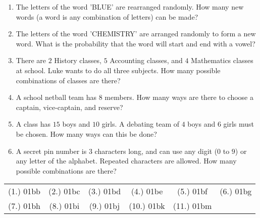 \begin{eocexercises}{}
\begin{enumerate}
\item The letters of the word 'BLUE' are rearranged randomly. How many new words (a word is any combination of letters) can be made?

\item The letters of the word 'CHEMISTRY' are arranged randomly to form a new word. What is the probability that the word will start and end with a vowel?

\item There are $2$ History classes, $5$ Accounting classes, and $4$ Mathematics classes at school. Luke wants to do all three subjects. How many possible combinations of classes are there?

\item A school netball team has $8$ members. How many ways are there to choose a captain, vice-captain, and reserve?

\item A class has $15$ boys and $10$ girls. A debating team of $4$ boys and $6$ girls must be chosen. How many ways can this be done?

\item A secret pin number is $3$ characters long, and can use any digit ($0$ to $9$) or any letter of the alphabet. Repeated characters are allowed. How many possible combinations are there?


\end{enumerate}









\par \practiceinfo
\par \begin{tabular}[h]{cccccc}
(1.)	01bb	&
(2.)	01bc	&
(3.)	01bd	&
(4.)	01be	&
(5.)	01bf	&
(6.)	01bg	\\ %
(7.)	01bh	&
(8.)	01bi	&
(9.)	01bj	&
(10.)	01bk	&
(11.)	01bm	&
\end{tabular}
\end{eocexercises}%
